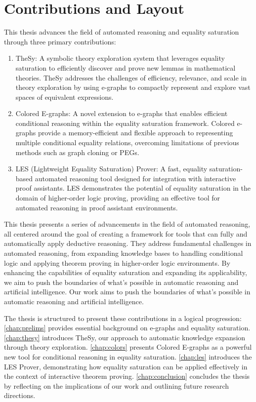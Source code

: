 
\section{Contributions and Layout}

This thesis advances the field of automated reasoning and equality saturation through three primary contributions:

\begin{enumerate}
    \item TheSy: A symbolic theory exploration system that leverages equality saturation to efficiently discover and prove new lemmas in mathematical theories. 
    TheSy addresses the challenges of efficiency, relevance, and scale in theory exploration by using e-graphs to compactly represent and explore vast spaces of equivalent expressions.
    \item Colored E-graphs: A novel extension to e-graphs that enables efficient conditional reasoning within the equality saturation framework. 
    Colored e-graphs provide a memory-efficient and flexible approach to representing multiple conditional equality relations, overcoming limitations of previous methods such as graph cloning or PEGs.
    \item LES (Lightweight Equality Saturation) Prover: A fast, equality saturation-based automated reasoning tool designed for integration with interactive proof assistants. 
    LES demonstrates the potential of equality saturation in the domain of higher-order logic proving, providing an effective tool for automated reasoning in proof assistant environments.
\end{enumerate}

This thesis presents a series of advancements in the field of automated reasoning, all centered around the goal of creating a framework for tools that can fully and automatically apply deductive reasoning. 
They address fundamental challenges in automated reasoning, from expanding knowledge bases to handling conditional logic and applying theorem proving in higher-order logic environments.
By enhancing the capabilities of equality saturation and expanding its applicability, we aim to push the boundaries of what's possible in automatic reasoning and artificial intelligence.
Our work aims to push the boundaries of what's possible in automatic reasoning and artificial intelligence.

The thesis is structured to present these contributions in a logical progression:
\autoref{chap:prelims} provides essential background on e-graphs and equality saturation.
\autoref{chap:thesy} introduces TheSy, our approach to automatic knowledge expansion through theory exploration.
\autoref{chap:colors} presents Colored E-graphs as a powerful new tool for conditional reasoning in equality saturation.
\autoref{chap:les} introduces the LES Prover, demonstrating how equality saturation can be applied effectively in the context of interactive theorem proving.
\autoref{chap:conclusion} concludes the thesis by reflecting on the implications of our work and outlining future research directions.

